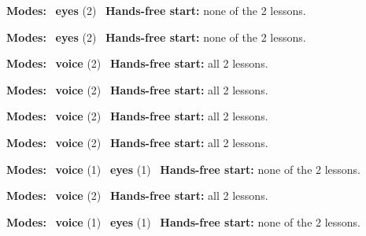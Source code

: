 \expandafter\def\csname hlchaptermodality6\endcsname{%
  {\small\noindent
    \textbf{Modes:} \hlsightsign{}~\textbf{eyes} (2)\quad
    \hlvoicesign{}~\textbf{Hands-free start:} none of the 2 lessons.%
    \par}\medskip
}

\expandafter\def\csname hlchaptermodality7\endcsname{%
  {\small\noindent
    \textbf{Modes:} \hlsightsign{}~\textbf{eyes} (2)\quad
    \hlvoicesign{}~\textbf{Hands-free start:} none of the 2 lessons.%
    \par}\medskip
}

\expandafter\def\csname hlchaptermodality8\endcsname{%
  {\small\noindent
    \textbf{Modes:} \hlvoicesign{}~\textbf{voice} (2)\quad
    \hlvoicesign{}~\textbf{Hands-free start:} all 2 lessons.%
    \par}\medskip
}

\expandafter\def\csname hlchaptermodality9\endcsname{%
  {\small\noindent
    \textbf{Modes:} \hlvoicesign{}~\textbf{voice} (2)\quad
    \hlvoicesign{}~\textbf{Hands-free start:} all 2 lessons.%
    \par}\medskip
}

\expandafter\def\csname hlchaptermodality10\endcsname{%
  {\small\noindent
    \textbf{Modes:} \hlvoicesign{}~\textbf{voice} (2)\quad
    \hlvoicesign{}~\textbf{Hands-free start:} all 2 lessons.%
    \par}\medskip
}

\expandafter\def\csname hlchaptermodality11\endcsname{%
  {\small\noindent
    \textbf{Modes:} \hlvoicesign{}~\textbf{voice} (2)\quad
    \hlvoicesign{}~\textbf{Hands-free start:} all 2 lessons.%
    \par}\medskip
}

\expandafter\def\csname hlchaptermodality12\endcsname{%
  {\small\noindent
    \textbf{Modes:} \hlvoicesign{}~\textbf{voice} (1) \quad \hlsightsign{}~\textbf{eyes} (1)\quad
    \hlvoicesign{}~\textbf{Hands-free start:} none of the 2 lessons.%
    \par}\medskip
}

\expandafter\def\csname hlchaptermodality13\endcsname{%
  {\small\noindent
    \textbf{Modes:} \hlvoicesign{}~\textbf{voice} (2)\quad
    \hlvoicesign{}~\textbf{Hands-free start:} all 2 lessons.%
    \par}\medskip
}

\expandafter\def\csname hlchaptermodality14\endcsname{%
  {\small\noindent
    \textbf{Modes:} \hlvoicesign{}~\textbf{voice} (1) \quad \hlsightsign{}~\textbf{eyes} (1)\quad
    \hlvoicesign{}~\textbf{Hands-free start:} none of the 2 lessons.%
    \par}\medskip
}

